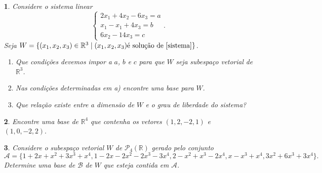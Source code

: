 \documentclass[12pt]{exam}
\newtheorem{exercicio}{}
\newcommand{\real}{\mathbb{R}}
\begin{document}
\begin{exercicio}
  Considere o sistema linear
  \begin{equation}\label{sistema}
    \begin{cases}
      2x_1 + 4x_2 - 6x_3 = a\\
      x_1 - x_1 + 4x_3 = b\\
      6x_2 - 14x_3 = c
    \end{cases}.
  \end{equation}
  Seja $W = \{(x_1, x_2, x_3) \in \real^3 \mid (x_1, x_2, x_3) \mbox{\'e solu\c{c}\~ao de } \eqref{sistema}\}$.
  \begin{enumerate}[label={\alph*})]
    \item Que condi\c{c}\~oes devemos impor a $a$, $b$ e $c$ para que $W$ seja subespa\c{c}o vetorial de $\real^3$.
    \item Nas condi\c{c}\~oes determinadas em \textit{a)} encontre uma base para $W$.
    \item Que rela\c{c}\~ao existe entre a dimens\~ao de $W$ e o grau de liberdade do sistema?
  \end{enumerate}
\end{exercicio}

\begin{exercicio}
  Encontre uma base de $\real^4$ que contenha os vetores $(1,2,-2,1)$ e $(1,0,-2,2)$.
\end{exercicio}

\begin{exercicio}
  Considere o subespa\c{c}o vetorial $W$ de $\mathcal{P}_4(\real)$ gerado pelo conjunto
  \[
    \mathcal{A} = \{1+2x+x^2+3x^3+x^4, 1-2x-2x^2-2x^3-3x^4,2-x^2+x^3-2x^4,x-x^3+x^4,3x^2+6x^3+3x^4\}.
  \]
  Determine uma base de $\mathcal{B}$ de $W$ que esteja contida em $\mathcal{A}$.
\end{exercicio}
\end{document}
